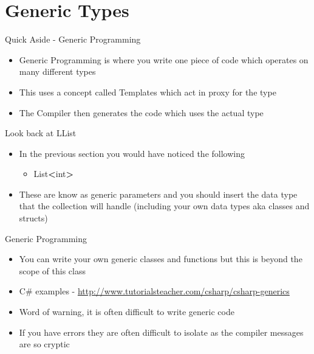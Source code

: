 \part{Generic Types}
\frame{\partpage}

\begin{frame}{Quick Aside - Generic Programming}
	\begin{itemize}
		\pause \item Generic Programming is where you write one piece of code which operates on many different types
		\pause \item This uses a concept called Templates which act in proxy for the type
		\pause \item The Compiler then generates the code which uses the actual type
	\end{itemize}
\end{frame}

\begin{frame}{Look back at LList}
	\begin{itemize}
		\pause \item In the previous section you would have noticed the following
		\begin{itemize}
			\pause \item List\textbf{\textless}int\textbf{\textgreater} 
		\end{itemize} 
		\pause \item These are know as generic parameters and you should insert the data type that the collection will handle (including your own data types aka classes and structs)
	\end{itemize}
\end{frame}

\begin{frame}{Generic Programming}
	\begin{itemize}
		\pause \item You can write your own generic classes and functions but this is beyond the scope of this class
		\pause \item C\# examples -
		\url{http://www.tutorialsteacher.com/csharp/csharp-generics}
		\pause \item Word of warning, it is often difficult to write generic code
		\pause \item If you have errors they are often difficult to isolate as the compiler messages are so cryptic
	\end{itemize}
\end{frame}